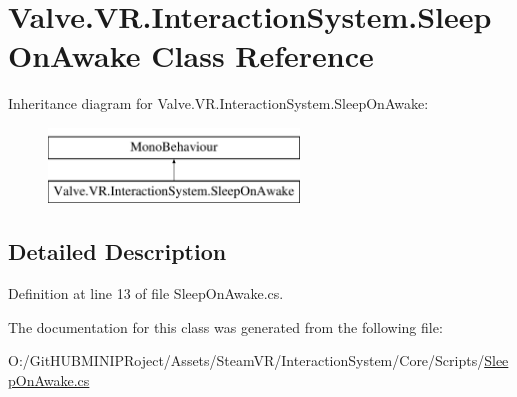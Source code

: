 \hypertarget{class_valve_1_1_v_r_1_1_interaction_system_1_1_sleep_on_awake}{}\section{Valve.\+V\+R.\+Interaction\+System.\+Sleep\+On\+Awake Class Reference}
\label{class_valve_1_1_v_r_1_1_interaction_system_1_1_sleep_on_awake}
Inheritance diagram for Valve.\+V\+R.\+Interaction\+System.\+Sleep\+On\+Awake\+:\begin{figure}[H]
\begin{center}
\leavevmode
\includegraphics[height=2.000000cm]{class_valve_1_1_v_r_1_1_interaction_system_1_1_sleep_on_awake}
\end{center}
\end{figure}


\subsection{Detailed Description}


Definition at line 13 of file Sleep\+On\+Awake.\+cs.



The documentation for this class was generated from the following file\+:\begin{DoxyCompactItemize}
\item 
O\+:/\+Git\+H\+U\+B\+M\+I\+N\+I\+P\+Roject/\+Assets/\+Steam\+V\+R/\+Interaction\+System/\+Core/\+Scripts/\mbox{\hyperlink{_sleep_on_awake_8cs}{Sleep\+On\+Awake.\+cs}}\end{DoxyCompactItemize}
